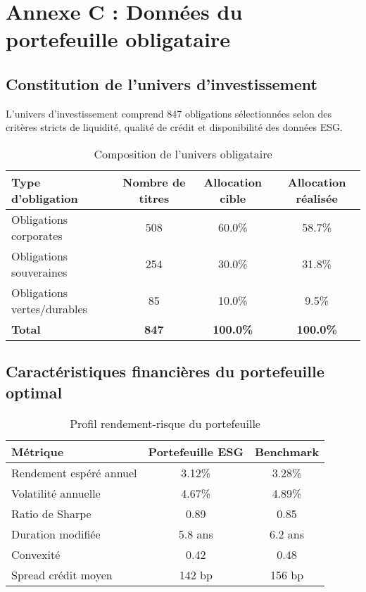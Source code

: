 \section{Annexe C : Données du portefeuille obligataire}

\subsection{Constitution de l'univers d'investissement}

L'univers d'investissement comprend 847 obligations sélectionnées selon des critères stricts de liquidité, qualité de crédit et disponibilité des données ESG.

\begin{table}[h]
\centering
\caption{Composition de l'univers obligataire}
\begin{tabular}{lccc}
\toprule
\textbf{Type d'obligation} & \textbf{Nombre de titres} & \textbf{Allocation cible} & \textbf{Allocation réalisée} \\
\midrule
Obligations corporates & 508 & 60.0\% & 58.7\% \\
Obligations souveraines & 254 & 30.0\% & 31.8\% \\
Obligations vertes/durables & 85 & 10.0\% & 9.5\% \\
\midrule
\textbf{Total} & \textbf{847} & \textbf{100.0\%} & \textbf{100.0\%} \\
\bottomrule
\end{tabular}
\end{table}

\subsection{Caractéristiques financières du portefeuille optimal}

\begin{table}[h]
\centering
\caption{Profil rendement-risque du portefeuille}
\begin{tabular}{lcc}
\toprule
\textbf{Métrique} & \textbf{Portefeuille ESG} & \textbf{Benchmark} \\
\midrule
Rendement espéré annuel & 3.12\% & 3.28\% \\
Volatilité annuelle & 4.67\% & 4.89\% \\
Ratio de Sharpe & 0.89 & 0.85 \\
Duration modifiée & 5.8 ans & 6.2 ans \\
Convexité & 0.42 & 0.48 \\
Spread crédit moyen & 142 bp & 156 bp \\
\bottomrule
\end{tabular}
\end{table}

